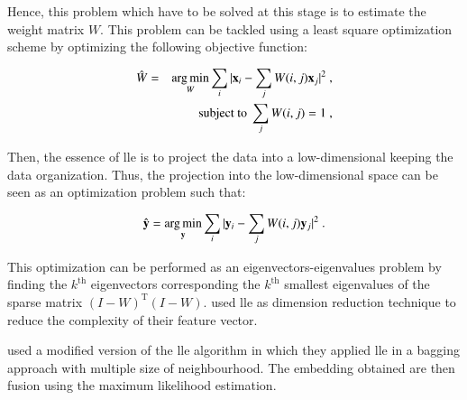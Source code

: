 Hence, this problem which have to be solved at this stage is to estimate the weight matrix $W$. This problem can be tackled using a least square optimization scheme by optimizing the following objective function:

\begin{eqnarray}
	\hat{W} & = & \operatorname*{arg\,min}_{W} \sum_i | \mathbf{x}_i - \sum_j W(i,j)\mathbf{x}_j |^{2} \ , \label{eq:lslle} \\
	&& \text{subject to } \sum_j W(i,j) = 1 \ , \nonumber
\end{eqnarray}

Then, the essence of \ac{lle} is to project the data into a low-dimensional keeping the data organization. Thus, the projection into the low-dimensional space can be seen as an optimization problem such that:

\begin{equation}
	\hat{\mathbf{y}} = \operatorname*{arg\,min}_{\mathbf{y}} \sum_i | \mathbf{y}_i - \sum_j W(i,j)\mathbf{y}_j |^{2} \ .
	\label{eq:lowprojlle}
\end{equation}

This optimization can be performed as an eigenvectors-eigenvalues problem by finding the $k^{\text{th}}$ eigenvectors corresponding the $k^{\text{th}}$ smallest eigenvalues of the sparse matrix $(I-W)^{\text{T}}(I-W)$. \cite{Tiwari2008,Tiwari2009,Viswanath2008,Viswanath2008a} used \ac{lle} as dimension reduction technique to reduce the complexity of their feature vector.

\cite{Tiwari2008} used a modified version of the \ac{lle} algorithm in which they applied \ac{lle} in a bagging approach with multiple size of neighbourhood. The embedding obtained are then fusion using the maximum likelihood estimation.